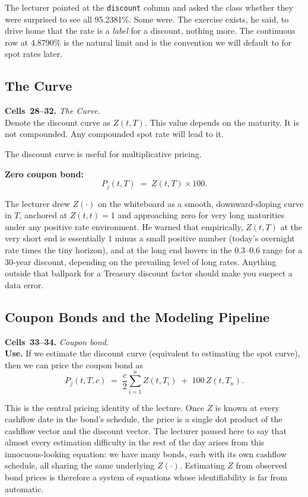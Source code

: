 The lecturer pointed at the \texttt{discount} column and asked the class
whether they were surprised to see all 95.2381\%. Some were. The exercise
exists, he said, to drive home that the rate is a \emph{label} for a discount,
nothing more. The continuous row at 4.8790\% is the natural limit and is the
convention we will default to for spot rates later.

\subsection{The Curve}\label{L1-sec:curve}

\begin{keyblock}
\textbf{Cells~28--32.} \emph{The Curve.}\\
Denote the discount curve as $Z(t,T)$. This value depends on the maturity. It
is not compounded. Any compounded spot rate will lead to it.

The discount curve is useful for multiplicative pricing.

\textbf{Zero coupon bond:}
\[
    P_j(t,T) \;=\; Z(t,T) \times 100.
\]
\end{keyblock}

The lecturer drew $Z(\cdot)$ on the whiteboard as a smooth, downward-sloping
curve in $T$, anchored at $Z(t,t)=1$ and approaching zero for very long
maturities under any positive rate environment. He warned that empirically,
$Z(t,T)$ at the very short end is essentially $1$ minus a small positive
number (today's overnight rate times the tiny horizon), and at the long end
hovers in the $0.3$--$0.6$ range for a 30-year discount, depending on the
prevailing level of long rates. Anything outside that ballpark for a Treasury
discount factor should make you suspect a data error.

\subsection{Coupon Bonds and the Modeling Pipeline}\label{L1-sec:coupon}

\begin{keyblock}
\textbf{Cells~33--34.} \emph{Coupon bond.}\\
\textbf{Use.} If we estimate the discount curve (equivalent to estimating the
spot curve), then we can price the coupon bond as
\[
    P_j(t,T,c) \;=\; \frac{c}{2}\sum_{i=1}^{n} Z(t,T_i)
                     \;+\; 100\, Z(t,T_n).
\]
\end{keyblock}

This is the central pricing identity of the lecture. Once $Z$ is known at
every cashflow date in the bond's schedule, the price is a single dot product
of the cashflow vector and the discount vector. The lecturer paused here to
say that almost every estimation difficulty in the rest of the day arises from
this innocuous-looking equation: we have many bonds, each with its own
cashflow schedule, all sharing the same underlying $Z(\cdot)$. Estimating $Z$
from observed bond prices is therefore a system of equations whose
identifiability is far from automatic.

